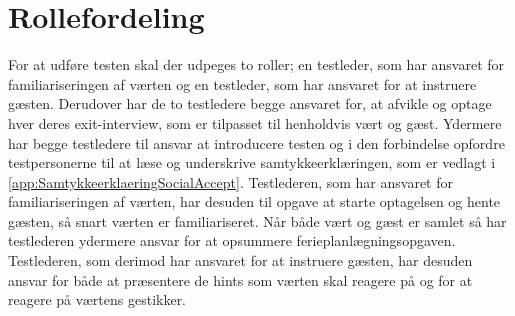 \section{Rollefordeling}
\label{RollefordelingSocialAccept}
% 
For at udføre testen skal der udpeges to roller; en testleder, som har ansvaret for familiariseringen af værten og en testleder, som har ansvaret for at instruere gæsten. Derudover har de to testledere begge ansvaret for, at afvikle og optage hver deres exit-interview, som er tilpasset til henholdvis vært og gæst. Ydermere har begge testledere til ansvar at introducere testen og i den forbindelse opfordre testpersonerne til at læse og underskrive samtykkeerklæringen, som er vedlagt i \autoref{app:SamtykkeerklaeringSocialAccept}. Testlederen, som har ansvaret for familiariseringen af værten, har desuden til opgave at starte optagelsen og hente gæsten, så snart værten er familiariseret. Når både vært og gæst er samlet så har testlederen ydermere ansvar for at opsummere ferieplanlægningsopgaven. Testlederen, som derimod har ansvaret for at instruere gæsten, har desuden ansvar for både at præsentere de hints som værten skal reagere på og for at reagere på værtens gestikker.     
